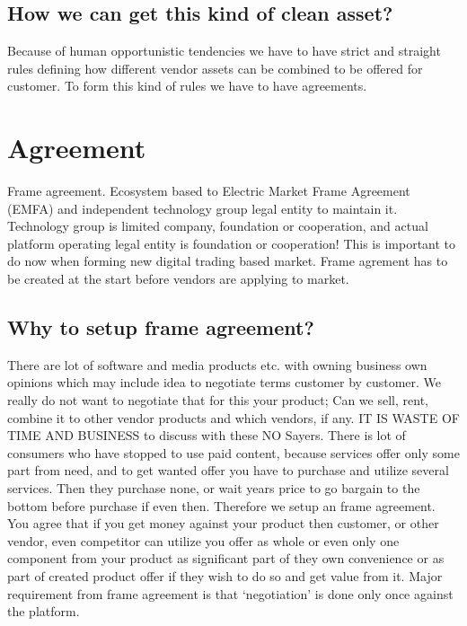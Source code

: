 \subsection{How we can get this kind of clean asset?}
\label{asset_cleanness}
Because of human opportunistic tendencies\allowbreak\cite{SevenSins} we have
to have strict and straight rules defining how different vendor assets can be
combined to be offered for customer. To form this kind of rules we have to
have agreements.

\section{Agreement}\label{frame_agreement}
Frame agreement. Ecosystem based to Electric Market Frame Agreement (EMFA)
and independent technology group legal entity to maintain it. Technology group
is limited company, foundation or cooperation, and actual platform operating
legal entity is foundation or cooperation! This is important to do now when
forming new digital trading based market. Frame agrement has to be created at
the start before vendors are applying to market.

\subsection{Why to setup frame agreement?}
\label{frame_agreement_why}
There are lot of software and media products etc. with owning business own
opinions which may include idea to negotiate terms customer by customer. We
really do not want to negotiate that for this your product; Can we sell, rent,
combine it to other vendor products and which vendors, if any. IT IS WASTE OF
TIME AND BUSINESS to discuss with these NO Sayers. There is lot of consumers
who have stopped to use paid content, because services offer only some part
from need, and to get wanted offer you have to purchase and utilize several
services. Then they purchase none, or wait years price to go bargain to the
bottom before purchase if even then. Therefore we setup an frame agreement.
You agree that if you get money against your product then customer, or other
vendor, even competitor can utilize you offer as whole or even only one
component from your product as significant part of they own convenience or as
part of created product offer if they wish to do so and get value from it.
Major requirement from frame agreement is that `negotiation' is done only once
against the platform.

